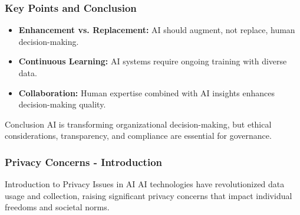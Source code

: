 \documentclass[aspectratio=169]{beamer}
\begin{document}
\begin{frame}[fragile]
    \frametitle{Key Points and Conclusion}
    \begin{itemize}
        \item \textbf{Enhancement vs. Replacement:} AI should augment, not replace, human decision-making.
        \item \textbf{Continuous Learning:} AI systems require ongoing training with diverse data.
        \item \textbf{Collaboration:} Human expertise combined with AI insights enhances decision-making quality.
    \end{itemize}
    \begin{block}{Conclusion}
        AI is transforming organizational decision-making, but ethical considerations, transparency, and compliance are essential for governance.
    \end{block}
\end{frame}

\begin{frame}[fragile]
    \frametitle{Privacy Concerns - Introduction}
    \begin{block}{Introduction to Privacy Issues in AI}
        AI technologies have revolutionized data usage and collection, raising significant privacy concerns that impact individual freedoms and societal norms.
    \end{block}
\end{frame}
\end{document}
